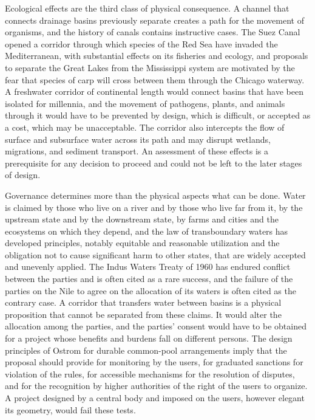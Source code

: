 Ecological effects are the third class of physical consequence. A channel that connects drainage basins previously separate creates a path for the movement of organisms, and the history of canals contains instructive cases. The Suez Canal opened a corridor through which species of the Red Sea have invaded the Mediterranean, with substantial effects on its fisheries and ecology, and proposals to separate the Great Lakes from the Mississippi system are motivated by the fear that species of carp will cross between them through the Chicago waterway. A freshwater corridor of continental length would connect basins that have been isolated for millennia, and the movement of pathogens, plants, and animals through it would have to be prevented by design, which is difficult, or accepted as a cost, which may be unacceptable. The corridor also intercepts the flow of surface and subsurface water across its path and may disrupt wetlands, migrations, and sediment transport. An assessment of these effects is a prerequisite for any decision to proceed and could not be left to the later stages of design.

Governance determines more than the physical aspects what can be done. Water is claimed by those who live on a river and by those who live far from it, by the upstream state and by the downstream state, by farms and cities and the ecosystems on which they depend, and the law of transboundary waters has developed principles, notably equitable and reasonable utilization and the obligation not to cause significant harm to other states, that are widely accepted and unevenly applied. The Indus Waters Treaty of 1960 has endured conflict between the parties and is often cited as a rare success, and the failure of the parties on the Nile to agree on the allocation of its waters is often cited as the contrary case. A corridor that transfers water between basins is a physical proposition that cannot be separated from these claims. It would alter the allocation among the parties, and the parties' consent would have to be obtained for a project whose benefits and burdens fall on different persons. The design principles of Ostrom for durable common-pool arrangements imply that the proposal should provide for monitoring by the users, for graduated sanctions for violation of the rules, for accessible mechanisms for the resolution of disputes, and for the recognition by higher authorities of the right of the users to organize. A project designed by a central body and imposed on the users, however elegant its geometry, would fail these tests.

